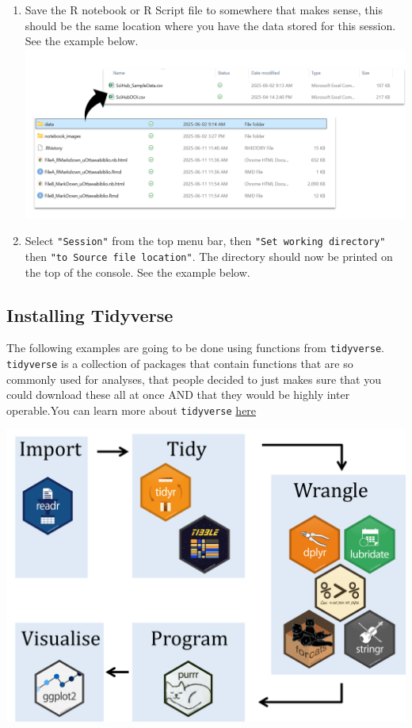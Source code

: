 \documentclass[
]{article}
\begin{document}
\begin{enumerate}
\def\labelenumi{\arabic{enumi}.}
\item
  Save the R notebook or R Script file to somewhere that makes sense,
  this should be the same location where you have the data stored for
  this session. See the example below.
  \includegraphics{notebook_images/FileSetUp.png}
\item
  Select \texttt{"Session"} from the top menu bar, then
  \texttt{"Set\ working\ directory"} then
  \texttt{"to\ Source\ file\ location"}. The directory should now be
  printed on the top of the console. See the example below.
\end{enumerate}

\subsection{Installing Tidyverse}\label{installing-tidyverse}

The following examples are going to be done using functions from
\texttt{tidyverse}. \texttt{tidyverse} is a collection of packages that
contain functions that are so commonly used for analyses, that people
decided to just makes sure that you could download these all at once AND
that they would be highly inter operable.You can learn more about
\texttt{tidyverse}
\href{https://r4ds.hadley.nz/data-transform.html}{here}

\includegraphics{notebook_images/tidy_workflow.png}
\end{document}
